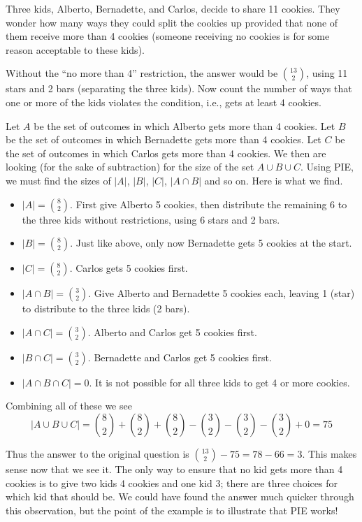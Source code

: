 \documentclass[12pt]{article}
\begin{document}
\begin{example}
Three kids, Alberto, Bernadette, and Carlos, decide to share 11 cookies.  They wonder how many ways they could split the cookies up provided that none of them receive more than 4 cookies (someone receiving no cookies is for some reason acceptable to these kids).

\begin{solution}
Without the ``no more than 4'' restriction, the answer would be ${13 \choose 2}$, using 11 stars and 2 bars (separating the three kids).  Now count the number of ways that one or more of the kids violates the condition, i.e., gets at least 4 cookies.

Let $A$ be the set of outcomes in which Alberto gets more than 4 cookies.  Let $B$ be the set of outcomes in which Bernadette gets more than 4 cookies.  Let $C$ be the set of outcomes in which Carlos gets more than 4 cookies.  We then are looking (for the sake of subtraction) for the size of the set $A \cup B \cup C$.  Using PIE, we must find the sizes of $|A|$, $|B|$, $|C|$, $|A\cap B|$ and so on.  Here is what we find.

\begin{itemize}
\item[] $|A| = {8 \choose 2}$.  First give Alberto 5 cookies, then distribute the remaining 6 to the three kids without restrictions, using 6 stars and 2 bars.
\item[] $|B| = {8 \choose 2}$.  Just like above, only now Bernadette gets 5 cookies at the start.
\item[] $|C| = {8 \choose 2}$.  Carlos gets 5 cookies first.

\item[] $|A \cap B| = {3 \choose 2}$.  Give Alberto and Bernadette 5 cookies each, leaving 1 (star) to distribute to the three kids (2 bars).

\item[] $|A \cap C| = {3 \choose 2}$.  Alberto and Carlos get 5 cookies first.  

\item[] $|B \cap C| = {3 \choose 2}$.  Bernadette and Carlos get 5 cookies first.

\item[] $|A \cap B \cap C| = 0$.  It is not possible for all three kids to get 4 or more cookies.
\end{itemize}

Combining all of these we see
\[|A \cup B \cup C| = {8 \choose 2} + {8 \choose 2} + {8 \choose 2} - {3 \choose 2} - {3 \choose 2} - {3 \choose 2} + 0 = 75\]

Thus the answer to the original question is ${13 \choose 2} - 75 = 78 - 66 = 3$.  This makes sense now that we see it.  The only way to ensure that no kid gets more than 4 cookies is to give two kids 4 cookies and one kid 3; there are three choices for which kid that should be.  We could have found the answer much quicker through this observation, but the point of the example is to illustrate that PIE works!
\end{solution}
\end{example}
\end{document}
